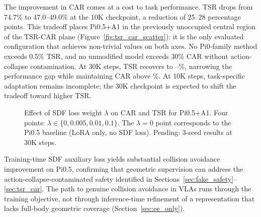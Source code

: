 The improvement in CAR comes at a cost to task performance. TSR drops from 74.7\% to 47.0--49.0\% at the 10K checkpoint, a reduction of 25--28 percentage points. This tradeoff places Pi0.5+A1 in the previously unoccupied central region of the TSR-CAR plane (Figure~\ref{fig:tsr_car_scatter}): it is the only evaluated configuration that achieves non-trivial values on both axes. No Pi0-family method exceeds 0.5\% TSR, and no unmodified model exceeds 30\% CAR without action-collapse contamination. At 30K steps, TSR recovers to --\%, narrowing the performance gap while maintaining CAR above \%. At 10K steps, task-specific adaptation remains incomplete; the 30K checkpoint is expected to shift the tradeoff toward higher TSR.

\begin{figure}[t]
\centering
{}
\caption{Effect of SDF loss weight $\lambda$ on CAR and TSR for Pi0.5+A1. Four points: $\lambda \in \{0, 0.005, 0.01, 0.1\}$. The $\lambda = 0$ point corresponds to the Pi0.5 baseline (LoRA only, no SDF loss). Pending: 3-seed results at 30K steps.}
\label{fig:lambda_car}
\end{figure}

Training-time SDF auxiliary loss yields substantial collision avoidance improvement on Pi0.5, confirming that geometric supervision can address the action-collapse-contaminated safety identified in Sections~\ref{sec:fake_safety}--\ref{sec:tsr_car}. The path to genuine collision avoidance in VLAs runs through the training objective, not through inference-time refinement of a representation that lacks full-body geometric coverage (Section~\ref{sec:ee_only}).
